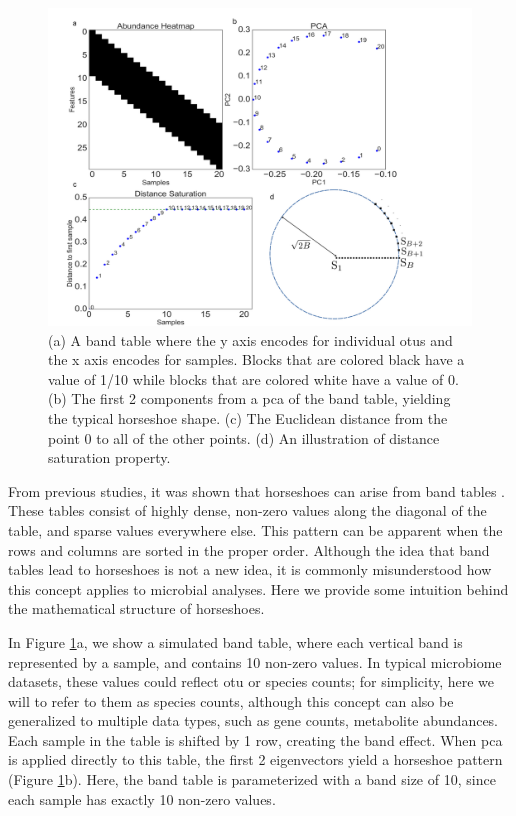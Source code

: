 \begin{figure}[H]
        \centering
        \includegraphics[width=1.1\textwidth]{ch2/Figure1.pdf}
        \caption[An explanation of the horseshoe effect arising from distance saturation.]
        {(a) A band table where the y axis encodes for individual \gls{otu}s and the x axis encodes for samples.  Blocks that are colored black have a value of 1/10 while blocks that are colored white have a value of 0.  (b) The first 2 components from a \gls{pca} of the band table, yielding the typical horseshoe shape.  (c) The Euclidean distance from the point 0 to all of the other points.  (d) An illustration of distance saturation property.}
        \label{figb1}
\end{figure}
From previous studies, it was shown that horseshoes can arise from band tables \cite{horseshoe_kernel} \cite{guttman_effect}.  These tables consist of highly dense, non-zero values along the diagonal of the table, and sparse values everywhere else.  This pattern can be apparent when the rows and columns are sorted in the proper order. Although the idea that band tables lead to horseshoes is not a new idea, it is commonly misunderstood how this concept applies to microbial analyses.  Here we provide some intuition behind the mathematical structure of horseshoes.\par
In Figure \ref{figb1}a, we show a simulated band table, where each vertical band is represented by a sample, and contains 10 non-zero values.  In typical microbiome datasets, these values could reflect \gls{otu} or species counts; for simplicity, here we will to refer to them as species counts, although this concept can also be generalized to multiple data types, such as gene counts, metabolite abundances.  Each sample in the table is shifted by 1 row, creating the band effect.  When \gls{pca} is applied directly to this table, the first 2 eigenvectors yield a horseshoe pattern (Figure \ref{figb1}b).  Here, the band table is parameterized with a band size of 10, since each sample has exactly 10 non-zero values.  \par
